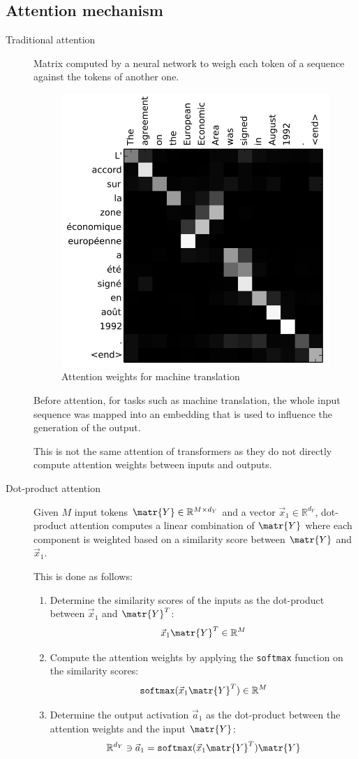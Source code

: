 \subsection{Attention mechanism}


\begin{description}
    \item[Traditional attention] 
        Matrix computed by a neural network to weigh each token of a sequence against the tokens of another one.

        \begin{figure}[H]
            \centering
            \includegraphics[width=0.3\linewidth]{./img/traditional_attention.png}
            \caption{Attention weights for machine translation}
        \end{figure}

        \begin{remark}
            Before attention, for tasks such as machine translation, the whole input sequence was mapped into an embedding that is used to influence the generation of the output.
        \end{remark}

        \begin{remark}
            This is not the same attention of transformers as they do not directly compute attention weights between inputs and outputs.
        \end{remark}

    \item[Dot-product attention] 
        Given $M$ input tokens $\matr{Y} \in \mathbb{R}^{M \times d_Y}$ and a vector $\vec{x}_1 \in \mathbb{R}^{d_Y}$, dot-product attention computes a linear combination of $\matr{Y}$ where each component is weighted based on a similarity score between $\matr{Y}$ and $\vec{x}_1$.

        This is done as follows:
        \begin{enumerate}
            \item Determine the similarity scores of the inputs as the dot-product between $\vec{x}_1$ and $\matr{Y}^T$:
                \[ \vec{x}_1 \matr{Y}^T \in \mathbb{R}^{M} \]
            \item Compute the attention weights by applying the \texttt{softmax} function on the similarity scores:
                \[ \texttt{softmax}(\vec{x}_1 \matr{Y}^T) \in \mathbb{R}^{M} \]
            \item Determine the output activation $\vec{a}_1$ as the dot-product between the attention weights and the input $\matr{Y}$:
                \[ \mathbb{R}^{d_Y} \ni \vec{a}_1 = \texttt{softmax}(\vec{x}_1 \matr{Y}^T) \matr{Y} \]
        \end{enumerate}


\end{description}
